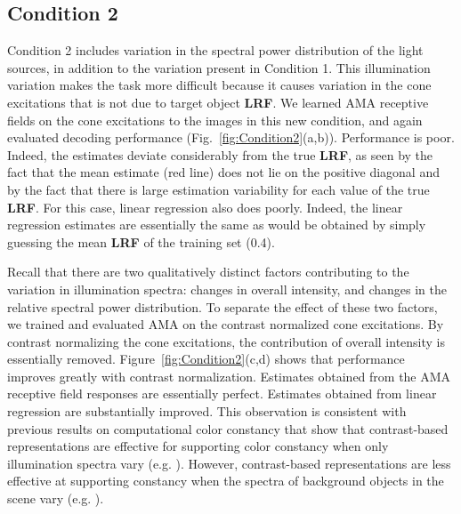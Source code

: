 \documentclass{jov}
\providecommand{\DIFaddtex}[1]{{\bf #1}} %
\providecommand{\DIFdeltex}[1]{} %
\providecommand{\DIFaddbegin}{} %
\providecommand{\DIFaddend}{} %
\providecommand{\DIFdelbegin}{} %
\providecommand{\DIFdelend}{} %
\providecommand{\DIFadd}[1]{\texorpdfstring{\DIFaddtex{#1}}{#1}} %
\providecommand{\DIFdel}[1]{\texorpdfstring{\DIFdeltex{#1}}{}} %
\newcommand{\DIFscaledelfig}{0.5}
\newlength{\DIFdelgraphicswidth} %
\newlength{\DIFdelgraphicsheight} %
\newcommand{\DIFaddincludegraphics}[2][]{{\color{blue}\fbox{\DIFOincludegraphics[#1]{#2}}}} %
\newcommand{\DIFdelincludegraphics}[2][]{%
\sbox{\DIFdelgraphicsbox}{\DIFOincludegraphics[#1]{#2}}%
\settoboxwidth{\DIFdelgraphicswidth}{\DIFdelgraphicsbox} %
\settoboxtotalheight{\DIFdelgraphicsheight}{\DIFdelgraphicsbox} %
\scalebox{\DIFscaledelfig}{%
\parbox[b]{\DIFdelgraphicswidth}{\usebox{\DIFdelgraphicsbox}\\[-\baselineskip] \rule{\DIFdelgraphicswidth}{0em}}\llap{\resizebox{\DIFdelgraphicswidth}{\DIFdelgraphicsheight}{%
\setlength{\unitlength}{\DIFdelgraphicswidth}%
\begin{picture}(1,1)%
\thicklines\linethickness{2pt} %
{\color[rgb]{1,0,0}\put(0,0){\framebox(1,1){}}}%
{\color[rgb]{1,0,0}\put(0,0){\line( 1,1){1}}}%
{\color[rgb]{1,0,0}\put(0,1){\line(1,-1){1}}}%
\end{picture}%
}\hspace*{3pt}}} %
} %
\DeclareRobustCommand{\DIFaddbegin}{\DIFOaddbegin \let\includegraphics\DIFaddincludegraphics} %
\DeclareRobustCommand{\DIFaddend}{\DIFOaddend \let\includegraphics\DIFOincludegraphics} %
\DeclareRobustCommand{\DIFdelbegin}{\DIFOdelbegin \let\includegraphics\DIFdelincludegraphics} %
\DeclareRobustCommand{\DIFdelend}{\DIFOaddend \let\includegraphics\DIFOincludegraphics} %
\begin{document}
\subsection{Condition 2}

Condition 2 includes variation in the spectral power distribution of the light sources, in addition to the variation present in Condition 1. 
This illumination variation makes the task more difficult because it causes variation in the cone excitations that is not due to target object \DIFdelbegin \DIFdel{LRV}\DIFdelend \DIFaddbegin \DIFadd{LRF}\DIFaddend . 
We learned AMA receptive fields on the cone excitations to the images in this new condition, and again evaluated decoding performance (Fig.~\ref{fig:Condition2}(a,b)). 
Performance is poor.
Indeed, the estimates deviate considerably from the true \DIFdelbegin \DIFdel{LRV}\DIFdelend \DIFaddbegin \DIFadd{LRF}\DIFaddend , as seen by the fact that the mean estimate
(red line) does not lie on the positive diagonal and by the fact that there is large estimation variability for each
value of the true \DIFdelbegin \DIFdel{LRV}\DIFdelend \DIFaddbegin \DIFadd{LRF}\DIFaddend .
For this case, linear regression also does poorly. Indeed, the linear regression estimates are essentially the same as would be obtained
by simply guessing the mean \DIFdelbegin \DIFdel{LRV }\DIFdelend \DIFaddbegin \DIFadd{LRF }\DIFaddend of the training set (0.4).

Recall that there are two qualitatively distinct factors contributing to the variation in illumination spectra: changes in overall intensity, and changes in the relative spectral power distribution. 
To separate the effect of these two factors, we trained and evaluated AMA on the contrast normalized cone excitations. 
By contrast normalizing the cone excitations, the contribution of overall intensity is essentially removed.
Figure~\ref{fig:Condition2}(c,d) shows that performance improves greatly with contrast normalization. 
Estimates obtained from the AMA receptive field responses are essentially perfect. 
Estimates obtained from linear regression are substantially improved.
This observation is consistent with previous results on computational color constancy that show that 
contrast-based representations are effective for supporting color constancy when only illumination spectra vary (e.g. ).
However, contrast-based representations are less effective at supporting constancy when the spectra of background objects in the scene vary (e.g. ).
\end{document}
